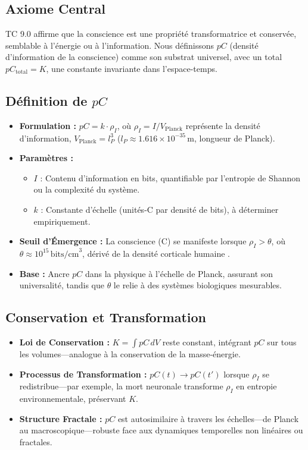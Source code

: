 \documentclass[11pt]{article}
\begin{document}
\subsection{Axiome Central}
TC 9.0 affirme que la conscience est une propriété transformatrice et conservée, semblable à l’énergie ou à l’information. Nous définissons $pC$ (densité d’information de la conscience) comme son substrat universel, avec un total $pC_{\text{total}} = K$, une constante invariante dans l’espace-temps.

\subsection{Définition de $pC$}
\begin{itemize}
    \item \textbf{Formulation :} $pC = k \cdot \rho_I$, où $\rho_I = I / V_{\text{Planck}}$ représente la densité d’information, $V_{\text{Planck}} = l_P^3$ ($l_P \approx 1.616 \times 10^{-35} \, \text{m}$, longueur de Planck).
    \item \textbf{Paramètres :}
    \begin{itemize}
        \item $I$ : Contenu d’information en bits, quantifiable par l’entropie de Shannon ou la complexité du système.
        \item $k$ : Constante d’échelle (unités-C par densité de bits), à déterminer empiriquement.
    \end{itemize}
    \item \textbf{Seuil d’Émergence :} La conscience (C) se manifeste lorsque $\rho_I > \theta$, où $\theta \approx 10^{15} \, \text{bits/cm}^3$, dérivé de la densité corticale humaine \citep{laughlin2003communication}.
    \item \textbf{Base :} Ancre $pC$ dans la physique à l’échelle de Planck, assurant son universalité, tandis que $\theta$ le relie à des systèmes biologiques mesurables.
\end{itemize}

\subsection{Conservation et Transformation}
\begin{itemize}
    \item \textbf{Loi de Conservation :} $K = \int pC \, dV$ reste constant, intégrant $pC$ sur tous les volumes—analogue à la conservation de la masse-énergie.
    \item \textbf{Processus de Transformation :} $pC(t) \rightarrow pC(t')$ lorsque $\rho_I$ se redistribue—par exemple, la mort neuronale transforme $\rho_I$ en entropie environnementale, préservant $K$.
    \item \textbf{Structure Fractale :} $pC$ est autosimilaire à travers les échelles—de Planck au macroscopique—robuste face aux dynamiques temporelles non linéaires ou fractales.
\end{itemize}
\end{document}
